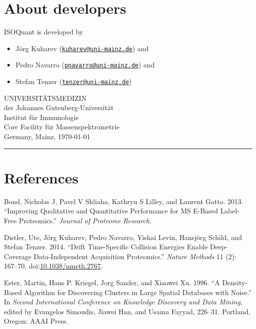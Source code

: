 \documentclass[]{article}
\providecommand{\tightlist}{%
  \setlength{\itemsep}{0pt}\setlength{\parskip}{0pt}}
\begin{document}
\clearpage

\section{About developers}\label{about-developers}

ISOQuant is developed by

\begin{itemize}
\tightlist
\item
  Jörg Kuharev
  (\href{mailto:kuharev@uni-mainz.de}{\nolinkurl{kuharev@uni-mainz.de}})
  and
\item
  Pedro Navarro
  (\href{mailto:pnavarro@uni-mainz.de}{\nolinkurl{pnavarro@uni-mainz.de}})
  and
\item
  Stefan Tenzer
  (\href{mailto:tenzer@uni-mainz.de}{\nolinkurl{tenzer@uni-mainz.de}})
\end{itemize}

UNIVERSITÄTSMEDIZIN\\
der Johannes Gutenberg-Universität\\
Institut für Immunologie\\
Core Facility für Massenspektrometrie\\
Germany, Mainz, \today

\begin{center}\rule{0.5\linewidth}{\linethickness}\end{center}

\clearpage

\section*{References}\label{references}

\hypertarget{refs}{}
\hypertarget{ref-bond_improving_2013}{}
Bond, Nicholas J, Pavel V Shliaha, Kathryn S Lilley, and Laurent Gatto.
2013. ``Improving Qualitative and Quantitative Performance for MS
E-Based Label-Free Proteomics.'' \emph{Journal of Proteome Research}.

\hypertarget{ref-distler_drift_2014}{}
Distler, Ute, Jörg Kuharev, Pedro Navarro, Yishai Levin, Hansjörg
Schild, and Stefan Tenzer. 2014. ``Drift Time-Specific Collision
Energies Enable Deep-Coverage Data-Independent Acquisition Proteomics.''
\emph{Nature Methods} 11 (2): 167--70.
doi:\href{https://doi.org/10.1038/nmeth.2767}{10.1038/nmeth.2767}.

\hypertarget{ref-ester_density-based_1996}{}
Ester, Martin, Hans P. Kriegel, Jorg Sander, and Xiaowei Xu. 1996. ``A
Density-Based Algorithm for Discovering Clusters in Large Spatial
Databases with Noise.'' In \emph{Second International Conference on
Knowledge Discovery and Data Mining}, edited by Evangelos Simoudis,
Jiawei Han, and Usama Fayyad, 226--31. Portland, Oregon: AAAI Press.
\end{document}
